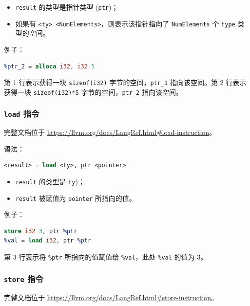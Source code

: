 \begin{itemize}
  \item \texttt{result} 的类型是指针类型 (\texttt{ptr})；
  \item 如果有 \texttt{<ty> <NumElements>}，则表示该指针指向了
    \texttt{NumElements} 个 \texttt{type} 类型的空间。
\end{itemize}

例子：
\begin{lstlisting}[language=llvm]
%ptr_1 = alloca i32
%ptr_2 = alloca i32, i32 5
\end{lstlisting}

第 1 行表示获得一块 \texttt{sizeof(i32)} 字节的空间，\texttt{ptr\_1} 指向该空间。第 2
行表示获得一块 \texttt{sizeof(i32)*5} 字节的空间，\texttt{ptr\_2} 指向该空间。

\subsubsection{\texttt{load} 指令}\label{LLVM-load-instructions}

\begin{remark}
完整文档位于 \url{https://llvm.org/docs/LangRef.html\#load-instruction}。
\end{remark}

语法：
\begin{lstlisting}[language=llvm]
<result> = load <ty>, ptr <pointer>
\end{lstlisting}

\begin{itemize}
  \item \texttt{result} 的类型是 \texttt{ty})；
  \item \texttt{result} 被赋值为 \texttt{pointer} 所指向的值。
\end{itemize}

例子：
\begin{lstlisting}[language=llvm]
%ptr = alloca i32
store i32 3, ptr %ptr
%val = load i32, ptr %ptr
\end{lstlisting}

第 3 行表示将 \texttt{\%ptr} 所指向的值赋值给 \texttt{\%val}，此处 \texttt{\%val}
的值为 3。

\subsubsection{\texttt{store} 指令}\label{LLVM-store-instructions}

\begin{remark}
完整文档位于 \url{https://llvm.org/docs/LangRef.html\#store-instruction}。
\end{remark}


